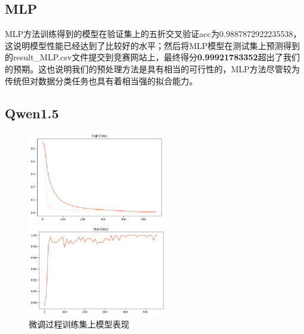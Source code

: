\documentclass[UTF8]{article}
\begin{document}
\subsection{MLP}
MLP方法训练得到的模型在验证集上的五折交叉验证acc为0.9887872922235538，这说明模型性能已经达到了比较好的水平；然后将MLP模型在测试集上预测得到的result\_MLP.csv文件提交到竞赛网站上，最终得分\textbf{0.99921783352}超出了我们的预期。这也说明我们的预处理方法是具有相当的可行性的，MLP方法尽管较为传统但对数据分类任务也具有着相当强的拟合能力。

\subsection{Qwen1.5}

\begin{figure}[H]
\centering
\begin{minipage}[b]{0.49\textwidth}
\centering
\includegraphics[height=4cm]{../img/train_loss}
\end{minipage}
\begin{minipage}[b]{0.49\textwidth}
\centering
\includegraphics[height=4cm]{../img/train_acc}
\end{minipage}
\caption{微调过程训练集上模型表现}
\end{figure}
\end{document}
